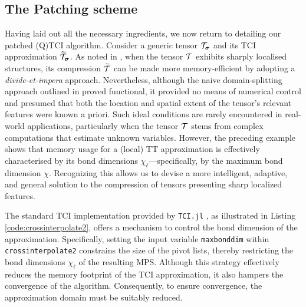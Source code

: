 \subsection{The Patching scheme}
Having laid out all the necessary ingredients, we now return to detailing our patched (Q)TCI algorithm. 
Consider a generic tensor $\mathcal{T}_{\boldsymbol{\sigma}}$ and its TCI approximation $\widetilde{\mathcal{T}}_{\boldsymbol{\sigma}}$. As noted in , when the tensor $\mathcal{T}$ exhibits sharply localised structures, its compression $\widetilde{\mathcal{T}}$ can be made more memory-efficient by adopting a \textit{divide-et-impera} approach. Nevertheless, although the naive domain-splitting approach outlined in  proved functional, it provided no means of numerical control and presumed that both the location and spatial extent of the tensor’s relevant features were known a priori. Such ideal conditions are rarely encountered in real-world applications, particularly when the tensor $\mathcal{T}$ stems from complex computations that estimate unknown variables. However, the preceding example shows that memory usage for a (local) TT approximation is effectively characterised by its bond dimensions $\chi_\ell$—specifically, by the maximum bond dimension $\chi$. Recognizing this allows us to devise a more intelligent, adaptive, and general solution to the compression of tensors presenting sharp localized features.

The standard TCI implementation provided by \texttt{TCI.jl} \cite{TensorCrossInterpolation.jl}, as illustrated in Listing \ref{code:crossinterpolate2}, offers a mechanism to control the bond dimension of the approximation. Specifically, setting the input variable \texttt{maxbonddim} within \texttt{crossinterpolate2} constrains the size of the pivot lists, thereby restricting the bond dimensions $\chi_\ell$ of the resulting MPS. Although this strategy effectively reduces the memory footprint of the TCI approximation, it also hampers the convergence of the algorithm. Consequently, to ensure convergence, the approximation domain must be suitably reduced. 

